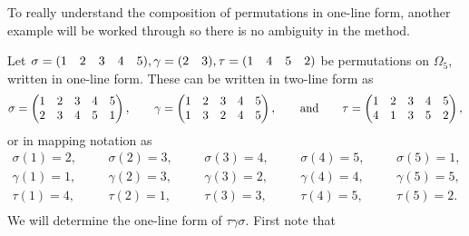 To really understand the composition of permutations in one-line form, another example will be worked through so there is no ambiguity in the method.

\begin{example}\label{eg:taugamsig}
    Let $\sigma = (1 \quad 2 \quad 3 \quad 4 \quad 5), \gamma = (2 \quad 3), \tau = (1 \quad 4 \quad 5 \quad 2)$ be permutations on $\Omega_{5}$, written in one-line form. These can be written in two-line form as
    \[
    \sigma = \begin{pmatrix}
        1 & 2 & 3 & 4 & 5 \\
        2 & 3 & 4 & 5 & 1 \\
    \end{pmatrix}, \hspace{20pt} \gamma = \begin{pmatrix}
        1 & 2 & 3 & 4 & 5 \\
        1 & 3 & 2 & 4 & 5 \\
    \end{pmatrix}, \hspace{20pt}\text{and}\hspace{20pt} \tau = \begin{pmatrix}
        1 & 2 & 3 & 4 & 5 \\
        4 & 1 & 3 & 5 & 2 \\
    \end{pmatrix},
    \]
    or in mapping notation as
    \[
    \begin{array}{ccccc}
        \sigma(1) = 2, \hspace{20pt} & \sigma(2) = 3, \hspace{20pt} & \sigma(3) = 4, \hspace{20pt} & \sigma(4) = 5, \hspace{20pt} & \sigma(5) = 1, \\[8pt]
        \gamma(1) = 1, \hspace{20pt} & \gamma(2) = 3, \hspace{20pt} & \gamma(3) = 2, \hspace{20pt} & \gamma(4) = 4, \hspace{20pt} & \gamma(5) = 5, \\[8pt]
        \tau(1) = 4, \hspace{20pt} & \tau(2) = 1, \hspace{20pt} & \tau(3) = 3, \hspace{20pt} & \tau(4) = 5, \hspace{20pt} & \tau(5) = 2. \\
    \end{array}
    \]
    We will determine the one-line form of $\tau\gamma\sigma$. First note that

\end{example}
